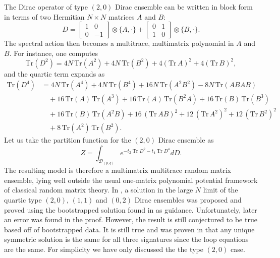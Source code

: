 \documentclass[11pt]{article}
\theoremstyle{plain}
\DeclareMathOperator{\tr}{Tr}
\begin{document}
The Dirac operator
of type $(2,0)$ Dirac ensemble can be written in block
form in terms of two Hermitian $N \times N$ matrices $A$ and $B$:
\begin{equation*}
	D =\left[\begin{array}{cc}
		1 & 0 \\
		0 & -1
	\end{array}\right] \otimes\{A, \cdot\}+\left[\begin{array}{ll}
	0 & 1 \\
	1 & 0
\end{array}\right] \otimes\{B, \cdot\} .
\end{equation*}
The 
spectral action then becomes a multitrace, multimatrix
polynomial in $A$ and $B$. For instance, one computes
\[
\mathrm{Tr}(D^{2}) = 4N \, \mathrm{Tr}(A^{2}) + 4N \, \mathrm{Tr}(B^{2})
   + 4(\mathrm{Tr}\,A)^{2} + 4(\mathrm{Tr}\,B)^{2},
\]
and the quartic term expands as
\begin{align*}
\mathrm{Tr}(D^{4}) &= 4N \, \mathrm{Tr}(A^{4}) + 4N \, \mathrm{Tr}(B^{4})
 + 16N \,\mathrm{Tr}(A^{2}B^{2}) - 8N \,\mathrm{Tr}(ABAB)  \\
&\quad + 16\,\mathrm{Tr}(A)\,\mathrm{Tr}(A^{3})
     + 16\,\mathrm{Tr}(A)\,\mathrm{Tr}(B^{2}A)
     + 16\,\mathrm{Tr}(B)\,\mathrm{Tr}(B^{3})  \\
&\quad + 16\,\mathrm{Tr}(B)\,\mathrm{Tr}(A^{2}B)
     + 16\,(\mathrm{Tr}\,AB)^{2}
     + 12\,(\mathrm{Tr}\,A^{2})^{2}
     + 12\,(\mathrm{Tr}\,B^{2})^{2} \\
&\quad + 8\,\mathrm{Tr}(A^{2})\,\mathrm{Tr}(B^{2}).
\end{align*}
Let us take the partition function for the $(2,0)$ Dirac ensemble as
\[
Z = \int_{\mathcal{D}_{(p,q)}} e^{-t_{2}\tr D^2 - t_{4} \tr D^4}dD. 
\]
The resulting model is therefore a multimatrix multitrace random
matrix ensemble, lying well outside the usual one-matrix polynomial potential
framework of classical random matrix theory. In \cite{Khalkhali2024 coloured maps},  a solution in the large $N$ limit of the quartic type $(2,0)$, $(1,1)$ and $(0,2)$ Dirac ensembles was proposed and proved using the bootstrapped solution found in \cite{hessam2022bootstrapping} as guidance. Unfortunately, later an error was found in the proof. However, the result is still conjectured to be true based off of bootstrapped data. It is still true and was proven in \cite{Khalkhali2025 large N limit} that any unique symmetric solution is the same for all three signatures since the loop equations are the same. For simplicity we have only discussed the the type $(2,0)$ case.
\end{document}
